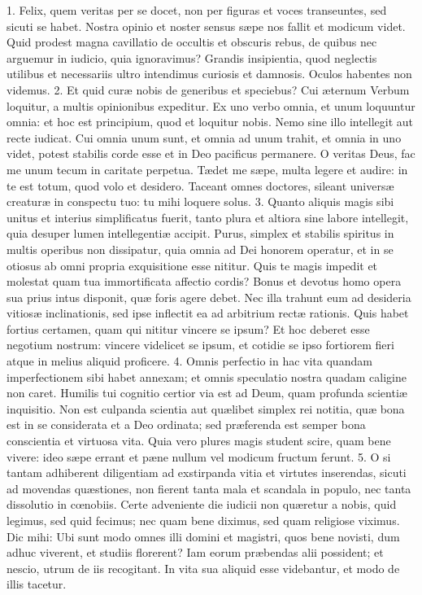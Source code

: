 1. Felix, quem veritas per se docet, non per figuras et voces transeuntes, sed sicuti se habet. Nostra opinio et noster sensus sæpe nos fallit et modicum videt. Quid prodest magna cavillatio de occultis et obscuris rebus, de quibus nec arguemur in iudicio, quia ignoravimus? Grandis insipientia, quod neglectis utilibus et necessariis ultro intendimus curiosis et damnosis. Oculos habentes non videmus.
2. Et quid curæ nobis de generibus et speciebus? Cui æternum Verbum loquitur, a multis opinionibus expeditur. Ex uno verbo omnia, et unum loquuntur omnia: et hoc est principium, quod et loquitur nobis. Nemo sine illo intellegit aut recte iudicat. Cui omnia unum sunt, et omnia ad unum trahit, et omnia in uno videt, potest stabilis corde esse et in Deo pacificus permanere. O veritas Deus, fac me unum tecum in caritate perpetua. Tædet me sæpe, multa legere et audire: in te est totum, quod volo et desidero. Taceant omnes doctores, sileant universæ creaturæ in conspectu tuo: tu mihi loquere solus.
3. Quanto aliquis magis sibi unitus et interius simplificatus fuerit, tanto plura et altiora sine labore intellegit, quia desuper lumen intellegentiæ accipit. Purus, simplex et stabilis spiritus in multis operibus non dissipatur, quia omnia ad Dei honorem operatur, et in se otiosus ab omni propria exquisitione esse nititur. Quis te magis impedit et molestat quam tua immortificata affectio cordis? Bonus et devotus homo opera sua prius intus disponit, quæ foris agere debet. Nec illa trahunt eum ad desideria vitiosæ inclinationis, sed ipse inflectit ea ad arbitrium rectæ rationis. Quis habet fortius certamen, quam qui nititur vincere se ipsum? Et hoc deberet esse negotium nostrum: vincere videlicet se ipsum, et cotidie se ipso fortiorem fieri atque in melius aliquid proficere.
4. Omnis perfectio in hac vita quandam imperfectionem sibi habet annexam; et omnis speculatio nostra quadam caligine non caret. Humilis tui cognitio certior via est ad Deum, quam profunda scientiæ inquisitio. Non est culpanda scientia aut quælibet simplex rei notitia, quæ bona est in se considerata et a Deo ordinata; sed præferenda est semper bona conscientia et virtuosa vita. Quia vero plures magis student scire, quam bene vivere: ideo sæpe errant et pæne nullum vel modicum fructum ferunt.
5. O si tantam adhiberent diligentiam ad exstirpanda vitia et virtutes inserendas, sicuti ad movendas quæstiones, non fierent tanta mala et scandala in populo, nec tanta dissolutio in cœnobiis. Certe adveniente die iudicii non quæretur a nobis, quid legimus, sed quid fecimus; nec quam bene diximus, sed quam religiose viximus. Dic mihi: Ubi sunt modo omnes illi domini et magistri, quos bene novisti, dum adhuc viverent, et studiis florerent? Iam eorum præbendas alii possident; et nescio, utrum de iis recogitant. In vita sua aliquid esse videbantur, et modo de illis tacetur.
